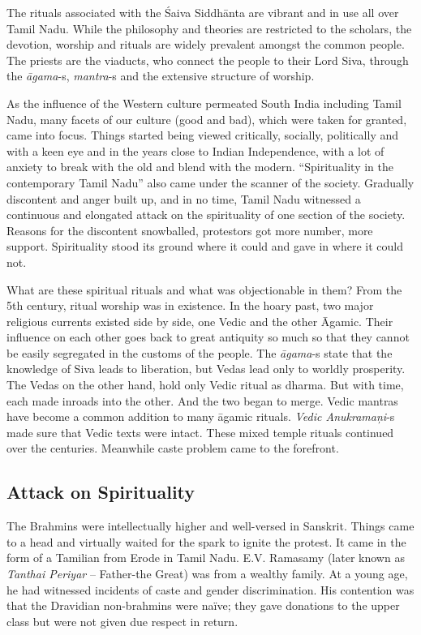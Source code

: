 The rituals associated with the Śaiva Siddhānta are vibrant and in use all over Tamil Nadu. While the philosophy and theories are restricted to the scholars, the devotion, worship and rituals are widely prevalent amongst the common people. The priests are the viaducts, who connect the people to their Lord Siva, through the \textit{āgama}-s, \textit{mantra}-s and the extensive structure of worship.

As the influence of the Western culture permeated South India including Tamil Nadu, many facets of our culture (good and bad), which were taken for granted, came into focus. Things started being viewed critically, socially, politically and with a keen eye and in the years close to Indian Independence, with a lot of anxiety to break with the old and blend with the modern. “Spirituality in the contemporary Tamil Nadu” also came under the scanner of the society. Gradually discontent and anger built up, and in no time, Tamil Nadu witnessed a continuous and elongated attack on the spirituality of one section of the society. Reasons for the discontent snowballed, protestors got more number, more support. Spirituality stood its ground where it could and gave in where it could not.

What are these spiritual rituals and what was objectionable in them? From the 5th century, ritual worship was in existence. In the hoary past, two major religious currents existed side by side, one Vedic and the other Āgamic. Their influence on each other goes back to great antiquity so much so that they cannot be easily segregated in the customs of the people. The \textit{āgama}-s state that the knowledge of Siva leads to liberation, but Vedas lead only to worldly prosperity. The Vedas on the other hand, hold only Vedic ritual as dharma. But with time, each made inroads into the other. And the two began to merge. Vedic mantras have become a common addition to many āgamic rituals. \textit{Vedic Anukramaņi}-s made sure that Vedic texts were intact. These mixed temple rituals continued over the centuries. Meanwhile caste problem came to the forefront.

\subsection*{Attack on Spirituality}

The Brahmins were intellectually higher and well-versed in Sanskrit. Things came to a head and virtually waited for the spark to ignite the protest. It came in the form of a Tamilian from Erode in Tamil Nadu. E.V. Ramasamy (later known as \textit{Tanthai Periyar} – Father-the Great) was from a wealthy family. At a young age, he had witnessed incidents of caste and gender discrimination. His contention was that the Dravidian non-brahmins were naïve; they gave donations to the upper class but were not given due respect in return. 

